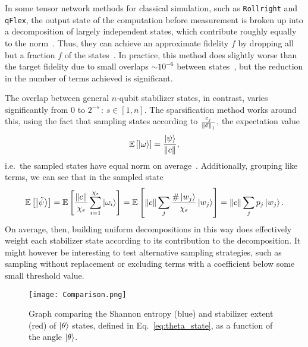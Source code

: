 In some tensor network methods for classical simulation, such as \texttt{Rollright} and \texttt{qFlex}, the output state of the computation before measurement is broken up into a decomposition of largely independent states, which contribute roughly equally to the norm~\cite{Markov2018,Villalonga2018}. Thus, they can achieve an approximate fidelity $f$ by dropping all but a fraction $f$ of the states~\cite{Markov2018}. In practice, this method does slightly worse than the target fidelity due to small overlaps $\sim10^{-6}$ between states~\cite{Villalonga2018}, but the reduction in the number of terms achieved is significant.\par
The overlap between general $n$-qubit stabilizer states, in contrast, varies significantly from $0$ to $2^{-s}\,:\,s\in\left[1,n\right]$. The sparsification method works around this, using the fact that sampling states according to $\frac{c_{j}}{\norm{\va{c}}_{1}}$, the expectation value 
\[\mathbb{E}\left[\ket{\omega}\right]=\frac{\ket{\psi}}{\norm{c}},\]
i.e.\ the sampled states have equal norm on average~\cite{Bravyi2018}. Additionally, grouping like terms, we can see that in the sampled state
\[\mathbb{E}\left[\ket{\tilde{\psi}}\right]=\mathbb{E}\left[\frac{\norm{c}}{\chi_{\epsilon}}\sum_{i=1}^{\chi_{\epsilon}}\ket{\omega_{i}}\right] = \mathbb{E}\left[\norm{c}
\sum_{j}\frac{\#\ket{w_{j}}}{\chi_{\epsilon}}\ket{w_{j}}\right]=\norm{c}\sum_{j}p_{j}\ket{w_{j}}.\]
On average, then, building uniform decompositions in this way does effectively weight each stabilizer state according to its contribution to the decomposition. It might however be interesting to test alternative sampling strategies, such as sampling without replacement or excluding terms with a coefficient below some small threshold value.
\begin{figure}[H]
\centering
\texttt{[image: Comparison.png]}
\caption{Graph comparing the Shannon entropy (blue) and stabilizer extent (red) of $\ket{\theta}$ states, defined in Eq.~\ref{eq:theta_state}, as a function of the angle $\ket{\theta}$.}
\label{fig:compression_comparison}
\end{figure}